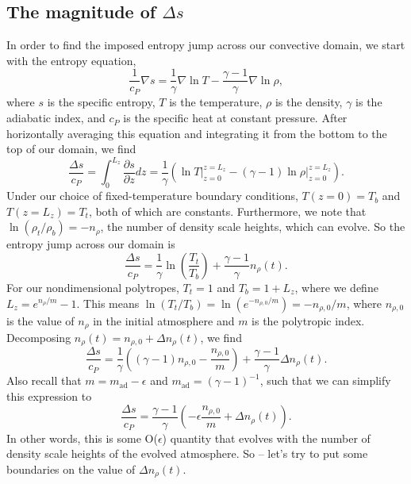 \documentclass[aps, pre, onecolumn, nofootinbib, notitlepage, groupedaddress, amsfonts, amssymb, amsmath, longbibliography, superscriptaddress]{revtex4-1}
\newcommand{\grad}{\ensuremath{\nabla}}
\begin{document}
\subsection{The magnitude of $\Delta s$}
In order to find the imposed entropy jump across our convective domain, we start with the entropy equation,
\begin{equation}
\frac{1}{c_P}\grad s = \frac{1}{\gamma}\grad\ln T - \frac{\gamma - 1}{\gamma}\grad \ln \rho,
\end{equation}
where $s$ is the specific entropy, $T$ is the temperature, $\rho$ is the density, $\gamma$ is the adiabatic index, and $c_P$ is the specific heat at constant pressure.
After horizontally averaging this equation and integrating it from the bottom to the top of our domain, we find
$$
\frac{\Delta s}{c_P} = \int_0^{L_z} \frac{\partial s}{\partial z} dz = \frac{1}{\gamma}\left(\ln T\bigg|_{z=0}^{z=L_z} - (\gamma-1)\ln\rho\bigg|_{z=0}^{z=L_z}\right).
$$
Under our choice of fixed-temperature boundary conditions, $T(z=0) = T_b$ and $T(z=L_z) = T_t$, both of which are constants.
Furthermore, we note that $\ln(\rho_t/\rho_b) = -n_\rho$, the number of density scale heights, which can evolve.
So the entropy jump across our domain is
\begin{equation}
\frac{\Delta s}{c_P} = \frac{1}{\gamma}\ln\left(\frac{T_t}{T_b}\right) + \frac{\gamma-1}{\gamma} n_\rho(t).
\end{equation}
For our nondimensional polytropes, $T_t = 1$ and $T_b = 1 + L_z$, where we define $L_z = e^{n_\rho/m} - 1$.
This means $\ln (T_t/T_b) = \ln (e^{-n_{\rho,0}/m}) = -n_{\rho,0}/m$, where $n_{\rho,0}$ is the value of $n_\rho$ in the initial atmosphere and $m$ is the polytropic index.
Decomposing $n_\rho(t) = n_{\rho,0} + \Delta n_\rho(t)$, we find
\begin{equation}
\frac{\Delta s}{c_P} = \frac{1}{\gamma}\left((\gamma-1)n_{\rho,0} - \frac{n_{\rho,0}}{m}\right) + \frac{\gamma-1}{\gamma}\Delta n_\rho(t).
\end{equation}
Also recall that $m = m_{\text{ad}} - \epsilon$ and $m_{\text{ad}} = (\gamma-1)^{-1}$, such that we can simplify this expression to 
\begin{equation}
\frac{\Delta s}{c_P} = \frac{\gamma-1}{\gamma}\left( -\epsilon \frac{n_{\rho,0}}{m} + \Delta n_\rho(t)\right).
\label{eqn:deltaS_evolved}
\end{equation}
In other words, this is some O($\epsilon$) quantity that evolves with the number of density scale heights of the evolved atmosphere.
So -- let's try to put some boundaries on the value of $\Delta n_\rho(t)$.
\end{document}
